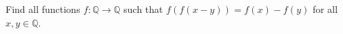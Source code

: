 Find all functions $f:\mathbb{Q}\to\mathbb{Q}$ such that $f(f(x-y))=f(x)-f(y)$ for all $x,y\in\mathbb{Q}$.
